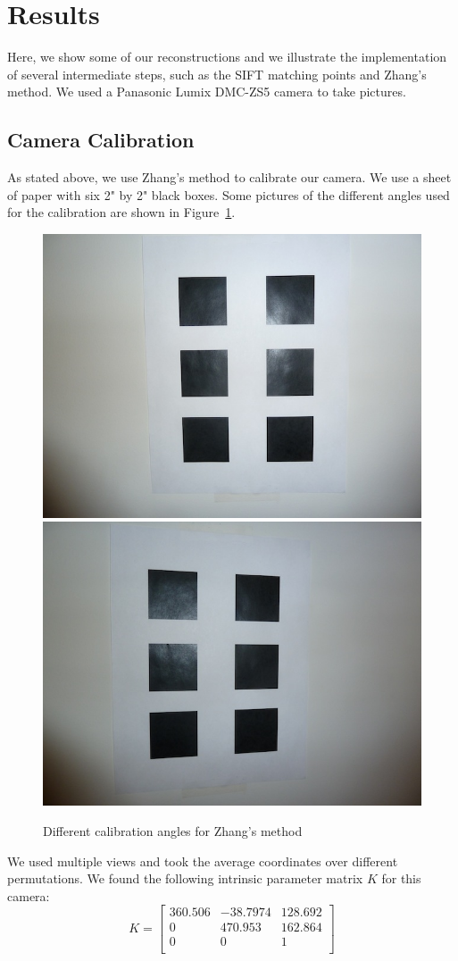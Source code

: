 \section{Results}
\label{s:results}

Here, we show some of our reconstructions and we illustrate the implementation of several intermediate steps, such as the SIFT matching points and Zhang's method. We used a Panasonic Lumix DMC-ZS5 camera to take pictures.

\subsection{Camera Calibration}
As stated above, we use Zhang's method to calibrate our camera. We use a sheet of paper with six 2" by 2" black boxes. Some pictures of the different angles used for the calibration are shown in Figure~\ref{calib_pics}. 

\begin{figure}[H]
\begin{center}
\includegraphics[width=0.45\linewidth]{figures/calib1.jpg}
\includegraphics[width=0.45\linewidth]{figures/calib2.jpg}
\end{center}
\caption{Different calibration angles for Zhang's method}
\label{calib_pics}
\end{figure}

We used multiple views and took the average coordinates over different permutations. We found the following intrinsic parameter matrix $K$ for this camera:
\begin{equation*}
K =
  \left[ {\begin{array}{ccc}
   360.506 & -38.7974 & 128.692  \\
  0 & 470.953 & 162.864 \\
   0 & 0 & 1 \\
  \end{array} } \right]
\end{equation*}

